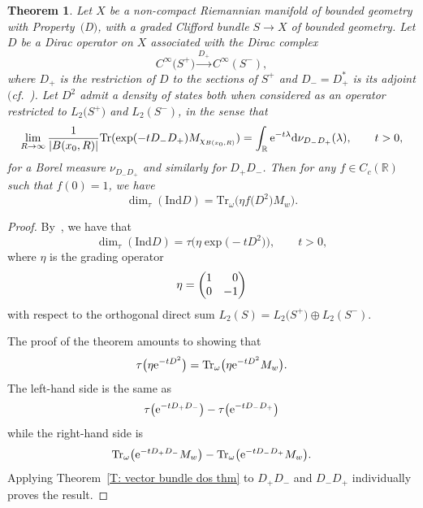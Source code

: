 \documentclass[pdftex]{sigma}
\numberwithin{equation}{section}
\newtheorem{Theorem}{Theorem}[section]
\begin{document}
\begin{Theorem}\label{roe_index_formula_theorem}
Let $X$ be a non-compact Riemannian manifold of bounded geometry with Property~$($D$)$, with a graded Clifford bundle $S \to X$ of bounded geometry. Let $D$ be a Dirac operator on $X$ associated with the Dirac complex
\[
C^\infty\big(S^+\big) \xrightarrow{D_+} C^\infty(S^-),
\]
where $D_+$ is the restriction of $D$ to the sections of $S^+$ and $D_- = D_+^*$ is its adjoint $($cf.~{\rm \cite[Chapter~11]{Roe1998})}.
 Let $D^2$ admit a density of states both when considered as an operator restricted to $L_2\big(S^+\big)$ and $L_2(S^-)$, in the sense that
 \[
 \lim_{R\to \infty} \frac{1}{|B(x_0,R)|} \mathrm{Tr}(\exp(-tD_-D_+)M_{\chi_{B(x_0,R)}}) = \int_{\mathbb{R}} {\rm e}^{-t\lambda} {\rm d}\nu_{D_-D_+}(\lambda), \qquad t>0,
 \]
 for a Borel measure $\nu_{D_-D_+}$ and similarly for $D_+D_-$. Then for any $f\in C_c(\mathbb{R})$ such that $f(0)=1$, we have
\[
\dim_\tau(\mathrm{Ind} D) = \mathrm{Tr}_\omega\big(\eta f\big(D^2\big)M_w\big).
\]
\end{Theorem}
\begin{proof}
By~\cite[Proposition~8.1]{Roe1988a}, we have that
\[
\dim_\tau(\text{Ind} D) = \tau\bigl(\eta \exp\bigl(-tD^2\bigr)\bigr), \qquad t>0,
\]
where $\eta$ is the grading operator
\[
 \eta = \begin{pmatrix} 1 & \hphantom{-} 0 \\ 0 & -1\end{pmatrix}
\]
with respect to the orthogonal direct sum $L_2(S) = L_2\big(S^+\big)\oplus L_2(S^-).$

The proof of the theorem amounts to showing that
\[
 \tau\big(\eta {\rm e}^{-tD^2}\big) = \mathrm{Tr}_{\omega}\big(\eta {\rm e}^{-tD^2}M_w\big).
\]
The left-hand side is the same as
\[
 \tau\big({\rm e}^{-tD_+D_-}\big)-\tau\big({\rm e}^{-tD_-D_+}\big)
\]
while the right-hand side is
\[
 \mathrm{Tr}_{\omega}\big({\rm e}^{-tD_+D_-}M_w\big)-\mathrm{Tr}_{\omega}\big({\rm e}^{-tD_-D_+}M_w\big).
\]
Applying Theorem~\ref{T: vector bundle dos thm} to $D_+D_-$ and $D_-D_+$ individually proves the result.
\end{proof}
\end{document}
